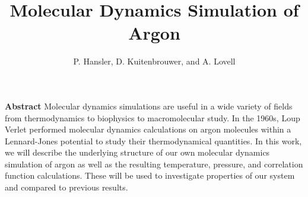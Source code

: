 \documentclass{article}
\begin{document}
\title{Molecular Dynamics Simulation of Argon}
\author{P. Hansler, D. Kuitenbrouwer, and A. Lovell}
\maketitle

\noindent \textbf{Abstract}  Molecular dynamics simulations are useful in a wide variety of fields from thermodynamics to biophysics to macromolecular study.  In the 1960s, Loup Verlet performed molecular dynamics calculations on argon molecules within a Lennard-Jones potential to study their thermodynamical quantities.  In this work, we will describe the underlying structure of our own molecular dynamics simulation of argon as well as the resulting temperature, pressure, and correlation function calculations.  These will be used to investigate properties of our system and compared to previous results.  \\
\end{document}
